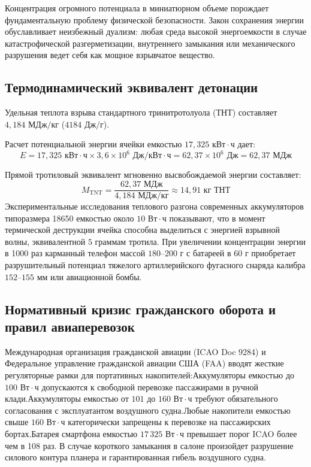 \documentclass[12pt,a4paper]{article}
\begin{document}
Концентрация огромного потенциала в миниатюрном объеме порождает 
фундаментальную проблему физической безопасности. Закон сохранения 
энергии обуславливает неизбежный дуализм: любая среда высокой 
энергоемкости в случае катастрофической разгерметизации, внутреннего 
замыкания или механического разрушения ведет себя как мощное 
взрывчатое вещество.

\subsection{Термодинамический эквивалент детонации}

Удельная теплота взрыва стандартного тринитротолуола (ТНТ) 
составляет $4{,}184\text{ МДж/кг}$ ($4184\text{ Дж/г}$).

Расчет потенциальной энергии ячейки емкостью 
$17{,}325\text{ кВт}\cdot\text{ч}$ дает:
$$
E = 17{,}325\text{ кВт}\cdot\text{ч} \times 3{,}6 \times 10^6\text{ Дж/кВт}\cdot\text{ч} = 62{,}37 \times 10^6\text{ Дж} = 62{,}37\text{ МДж}
$$

Прямой тротиловый эквивалент мгновенно высвобождаемой энергии 
составляет:
$$
M_{\text{TNT}} = \frac{62{,}37\text{ МДж}}{4{,}184\text{ МДж/кг}} \approx 14{,}91\text{ кг ТНТ}
$$
Экспериментальные исследования теплового разгона современных 
аккумуляторов типоразмера 18650 емкостью около 
$10\text{ Вт}\cdot\text{ч}$ показывают, что в момент термической 
деструкции ячейка способна выделиться с энергией взрывной волны, 
эквивалентной $5\text{ граммам}$ тротила. При увеличении концентрации 
энергии в 1000 раз карманный телефон массой $180\text{--}200\text{ г}$ 
с батареей в $60\text{ г}$ приобретает разрушительный потенциал 
тяжелого артиллерийского фугасного снаряда калибра 
$152\text{--}155\text{ мм}$ или авиационной бомбы.

\subsection{Нормативный кризис гражданского оборота и правил авиаперевозок}

Международная организация гражданской авиации (ICAO Doc 9284) и 
Федеральное управление гражданской авиации США (FAA) вводят жесткие 
регуляторные рамки для портативных накопителей:Аккумуляторы емкостью 
до $100\text{ Вт}\cdot\text{ч}$ допускаются к свободной перевозке 
пассажирами в ручной клади.Аккумуляторы емкостью от $101$ до 
$160\text{ Вт}\cdot\text{ч}$ требуют обязательного согласования с 
эксплуатантом воздушного судна.Любые накопители емкостью свыше 
$160\text{ Вт}\cdot\text{ч}$ категорически запрещены к перевозке на 
пассажирских бортах.Батарея смартфона емкостью 
$17\,325\text{ Вт}\cdot\text{ч}$ превышает порог ICAO более чем в 
108 раз. В случае короткого замыкания в салоне произойдет разрушение 
силового контура планера и гарантированная гибель воздушного судна.
\end{document}
